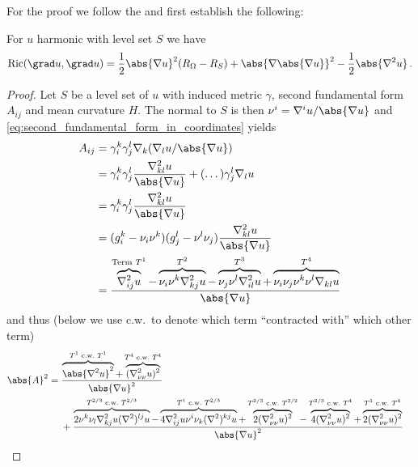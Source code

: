 \documentclass[titlepage,numbers=noenddot,oneside,%
cleardoublepage=empty,paper=a4,fontsize=11pt,%
english,%
]{scrartcl}
\newcommand*{\mathfullstop}{\,.}
\newcommand{\Ricci}{\mathrm{Ric}} %
\begin{document}
{For the proof we follow the \cite[Proof of Proposition 4.2 in][]{brayHarmonicFunctionsMass2019} and first establish the following:
\begin{lemma}\label{lem:main_identity}
    For \( u \) harmonic with level set \( S \) we have
    \begin{equation*}
        \Ricci(\grad u, \grad u)=\frac{1}{2}\abs{\nabla u}^2(R_\Omega-R_S)+\abs{\nabla\abs{\nabla u}}^2-\frac{1}{2}\abs{\nabla^2 u}\mathfullstop
    \end{equation*}
\end{lemma}
\begin{proof}  
    Let \( S \) be a level set of \( u \) with induced metric \( \gamma \), second fundamental form \( A_{ij} \) and mean curvature \( H \). The normal to \( S \) is then \( \nu^i=\nabla^i u/\abs{\nabla u} \) and \cref{eq:second_fundamental_form_in_coordinates} yields
    \begin{equation*}
        \begin{aligned}[t]
            A_{ij}&=\gamma^{k}_i\gamma^l_j \nabla_k (\nabla_l u/\abs{\nabla u})\\
            &=\gamma^{k}_i \gamma^{l}_j\frac{\nabla^2_{kl}u}{\abs{\nabla u}}+(\dotsc)\gamma^l_j\nabla_l u \\
            &=\gamma^{k}_i \gamma^l_j \frac{\nabla^2_{kl}u}{\abs{\nabla u}}\\
            &=(g^k_i-\nu_i \nu^k)(g^l_j - \nu^l \nu_j)\frac{\nabla^2_{kl}u}{\abs{\nabla u}}\\
            &=\frac{\overbrace{\nabla^2_{ij}u}^{    \text{Term \( T^1 \)}}-\overbrace{\nu_i \nu^k\nabla^2_{kj}u}^{T^2}-\overbrace{\nu_j \nu^l\nabla^2_{il}u}^{T^3}+\overbrace{\nu_i \nu_j \nu^k \nu^l\nabla_{kl}u}^{T^4}}{\abs{\nabla u}}
        \end{aligned}
    \end{equation*}
    and thus (below we use c.w.~to denote which term \enquote{contracted with} which other term)
    \newcommand{\cw}{\text{~c.w.~}}
    \begin{equation*}
        \begin{aligned}[t]
            \abs{A}^2&=\begin{aligned}[t]
                &\frac{\overbrace{\abs{\nabla^2 u}^2}^{T^1\cw T^1}+\overbrace{(\nabla^2_{\nu\nu}u)^2}^{T^4\cw T^4}}{\abs{\nabla u}^2}\\
            &+\frac{\overbrace{2\nu^k \nu_l \nabla^2_{kj}u (\nabla^2)^{lj}u}^{T^{2/3}\cw T^{2/3}}-\overbrace{4\nabla^2_{ij}u \nu^i \nu_k (\nabla^2)^{kj}u}^{T^{1}\cw T^{2/3}}+\overbrace{2(\nabla^2_{\nu\nu}u)^2}^{T^{2/3}\cw T^{3/2}}-\overbrace{4(\nabla^2_{\nu\nu}u)^2}^{T^{2/3}\cw T^{4}}+\overbrace{2(\nabla^2_{\nu\nu}u)^2}^{T^{1}\cw T^{4}}}{\abs{\nabla u}^2}

\end{aligned}
\end{aligned}
\end{equation*}
\end{proof}}
\end{document}
